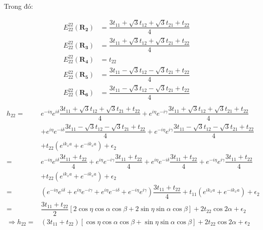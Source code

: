 \documentclass{report}
\begin{document}
Trong đó:

\begin{align*}
	E_{22}^{22}(\mathbf{R_2}) & = \dfrac{3t_{11} + \sqrt{3}t_{12} + \sqrt{3}t_{21} + t_{22}}{4} \\
	E_{22}^{22}(\mathbf{R_3}) & = \dfrac{3t_{11} + \sqrt{3}t_{12} + \sqrt{3}t_{21} + t_{22}}{4} \\
	E_{22}^{22}(\mathbf{R_4}) & = t_{22}                                                        \\
	E_{22}^{22}(\mathbf{R_5}) & = \dfrac{3t_{11} - \sqrt{3}t_{12} - \sqrt{3}t_{21} + t_{22}}{4} \\
	E_{22}^{22}(\mathbf{R_6}) & = \dfrac{3t_{11} - \sqrt{3}t_{12} - \sqrt{3}t_{21} + t_{22}}{4} \\
\end{align*}
\begin{align*}
	h_{22} =            & e^{-i\eta} e^{i\delta} \dfrac{3t_{11} + \sqrt{3}t_{12} + \sqrt{3}t_{21} + t_{22}}{4} + e^{i\eta} e^{-i\gamma} \dfrac{3t_{11} + \sqrt{3}t_{12} + \sqrt{3}t_{21} + t_{22}}{4}                                       \\
	                    & + e^{i\eta} e^{-i\delta} \dfrac{3t_{11} - \sqrt{3}t_{12} - \sqrt{3}t_{21} + t_{22}}{4}  + e^{-i\eta} e^{i\gamma} \dfrac{3t_{11} - \sqrt{3}t_{12} - \sqrt{3}t_{21} + t_{22}}{4}                                    \\
	                    & + t_{22}\left( e^{ik_x a} + e^{-ik_x a} \right) + \epsilon_2                                                                                                                                                      \\
	=                   & e^{-i\eta} e^{i\delta} \dfrac{3t_{11} + t_{22}}{4} + e^{i\eta} e^{-i\gamma} \dfrac{3t_{11} + t_{22}}{4} + e^{i\eta} e^{-i\delta} \dfrac{3t_{11} + t_{22}}{4} + e^{-i\eta} e^{i\gamma} \dfrac{3t_{11} + t_{22}}{4} \\
	                    & + t_{22}\left( e^{ik_x a} + e^{-ik_x a} \right) + \epsilon_2                                                                                                                                                      \\
	=                   & ( e^{-i\eta} e^{i\delta} + e^{i\eta} e^{-i\gamma} + e^{i\eta} e^{-i\delta} + e^{-i\eta} e^{i\gamma}) \dfrac{3t_{11} + t_{22}}{4} + t_{11}\left( e^{ik_x a} + e^{-ik_x a} \right) + \epsilon_2                     \\
	=                   & \dfrac{3t_{11} + t_{22}}{2} \left[ 2\cos\eta\cos\alpha\cos\beta + 2\sin\eta\sin\alpha\cos\beta \right] + 2t_{22}\cos2\alpha +\epsilon_2                                                                           \\
	\Rightarrow h_{22}= & (3t_{11} + t_{22}) \left[ \cos\eta\cos\alpha\cos\beta + \sin\eta\sin\alpha\cos\beta \right] + 2t_{22}\cos2\alpha + \epsilon_2
\end{align*}
\end{document}
